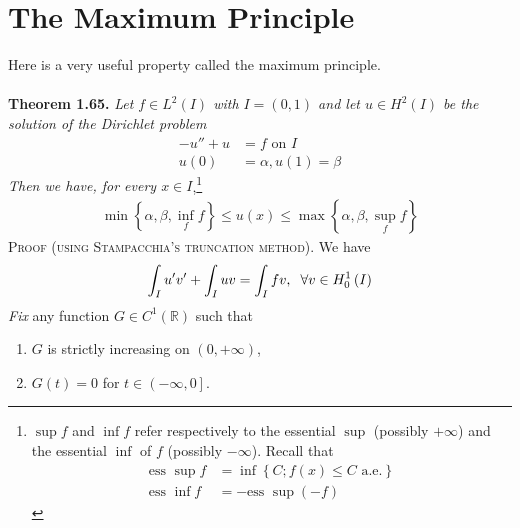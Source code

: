 \documentclass[a4paper,oneside]{book}
\numberwithin{equation}{chapter}
\begin{document}
\section{The Maximum Principle}
Here is a very useful property called the maximum principle.\\
\\
\textbf{Theorem 1.65.} \textit{Let $f\in L^2\left(I\right)$ with $I=\left(0,1\right)$ and let $u\in H^2\left(I\right)$ be the solution of the Dirichlet problem}
\begin{align}
 - u'' + u &= f\mbox{ on } I\\
u\left( 0 \right) &= \alpha ,u\left( 1 \right) = \beta 
\end{align}
\textit{Then we have, for every $x\in I$},\footnote{$\sup f$ and $\inf f$ refer respectively to the essential $\sup$ (possibly $+\infty$) and the essential $\inf$ of $f$ (possibly $-\infty$). Recall that 
\begin{align}
\mbox{ess }\sup f &= \inf \left\{ {C;f\left( x \right) \le C\mbox{ a.e.}} \right\}\\
\mbox{ess }\inf f &=  - \mbox{ess }\sup \left( { - f} \right)
\end{align}}
\begin{align}
\label{1.541}
\min \left\{ {\alpha ,\beta ,\mathop {\inf }\limits_f f} \right\} \le u\left( x \right) \le \max \left\{ {\alpha ,\beta ,\mathop {\sup }\limits_f f} \right\}
\end{align}
\textsc{Proof (using Stampacchia's truncation method).} We have
\begin{align}
\label{1.542}
\int_I {u'v'}  + \int_I {uv}  = \int_I {fv} ,\hspace{0.2cm}\forall v \in H_0^1\left( I \right)
\end{align}
\textit{Fix} any function $G\in C^1\left(\mathbb{R}\right)$ such that
\begin{enumerate}
\item $G$ is strictly increasing on $\left(0,+\infty\right)$,
\item $G\left(t\right)=0$ for $t\in \left(-\infty,0\right]$.
\end{enumerate}
\end{document}
